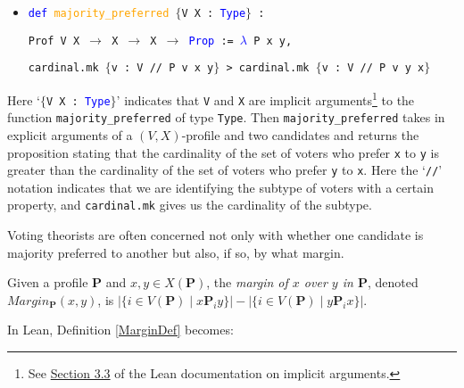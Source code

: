 \documentclass[runningheads]{llncs}
\begin{document}
\begin{itemize}
\item[] \texttt{\textcolor{blue}{def} \textcolor{orange}{majority\_preferred}  $\{$V X : \textcolor{blue}{Type}$\}$ :}

\texttt{Prof V X $\to$ X $\to$ X $\to$ \textcolor{blue}{Prop} := \textcolor{blue}{$\lambda$} P x y,}

\texttt{cardinal.mk $\{$v : V // P v x y$\}$ >
cardinal.mk $\{$v : V // P v y x$\}$}
\end{itemize}
Here `\texttt{$\{$V X : \textcolor{blue}{Type}$\}$}' indicates that \texttt{V} and \texttt{X} are implicit arguments\footnote{See \href{https://leanprover.github.io/reference/expressions.html\#implicit-arguments}{Section 3.3} of the Lean documentation on implicit arguments.} to the function \texttt{majority\_preferred} of type \texttt{Type}. Then \texttt{majority\_preferred} takes in explicit arguments of a $(V,X)$-profile and two candidates  and returns the proposition stating that the cardinality of the set of voters who prefer \texttt{x} to \texttt{y} is greater than the cardinality of the set of voters who prefer \texttt{y} to \texttt{x}. Here the `\texttt{//}' notation indicates that we are identifying the subtype of voters with a certain property, and \texttt{cardinal.mk} gives us the cardinality of the subtype.


Voting theorists are often concerned not only with whether one candidate is majority preferred to another but also, if so, by what margin.

\begin{definition}\label{MarginDef} \textnormal{Given a profile $\mathbf{P}$ and $x,y\in X(\mathbf{P})$, the \textit{margin of $x$ over $y$ in $\mathbf{P}$}, denoted $Margin_\mathbf{P}(x,y)$, is $|\{i\in V(\mathbf{P})\mid x\mathbf{P}_iy\}|-|\{i\in V(\mathbf{P})\mid y\mathbf{P}_ix\}|$.}
\end{definition}
\noindent In Lean, Definition \ref{MarginDef} becomes:
\end{document}
